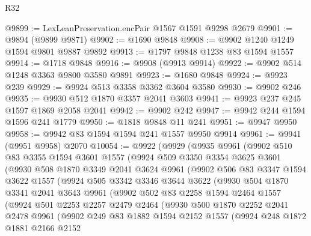 \begin{lexlean}{R32}
\begin{coremodule}
@9899 := LexLeanPreservation.encPair @1567 @1591 @9298 @2679
@9901 := @9894 (@9899 @9871)
@9902 := @1690 @9848
@9908 := @9902 @1240 @1249 @1594 @9801 @9887 @9892
@9913 := @1797 @9848 @1238 @83 @1594 @1557
@9914 := @1718 @9848
@9916 := @9908 (@9913 @9914)
@9922 := @9902 @514 @1248 @3363 @9800 @3580 @9891
@9923 := @1680 @9848
@9924 := @9923 @239
@9929 := @9924 @513 @3358 @3362 @3604 @3580
@9930 := @9902 @246
@9935 := @9930 @512 @1870 @3357 @2041 @3603
@9941 := @9923 @237 @245 @1597 @1869 @2058 @2041
@9942 := @9902 @242
@9947 := @9942 @244 @1594 @1596 @241 @1779
@9950 := @1818 @9848 @11 @241
@9951 := @9947 @9950
@9958 := @9942 @83 @1594 @1594 @241 @1557 @9950 @9914
@9961 := @9941 (@9951 @9958) @2070
@10054 := @9922
    (@9929
      (@9935
        @9961
        (@9902
          @510
          @83
          @3355
          @1594
          @3601
          @1557
          (@9924
            @509
            @3350
            @3354
            @3625
            @3601
            (@9930
              @508
              @1870
              @3349
              @2041
              @3624
              @9961
              (@9902
                @506
                @83
                @3347
                @1594
                @3622
                @1557
                (@9924
                  @505
                  @3342
                  @3346
                  @3644
                  @3622
                  (@9930
                    @504
                    @1870
                    @3341
                    @2041
                    @3643
                    @9961
                    (@9902
                      @502
                      @83
                      @2258
                      @1594
                      @2464
                      @1557
                      (@9924
                        @501
                        @2253
                        @2257
                        @2479
                        @2464
                        (@9930
                          @500
                          @1870
                          @2252
                          @2041
                          @2478
                          @9961
                          (@9902
                            @249
                            @83
                            @1882
                            @1594
                            @2152
                            @1557
                            (@9924
                              @248
                              @1872
                              @1881
                              @2166
                              @2152

\end{coremodule}
\end{lexlean}
